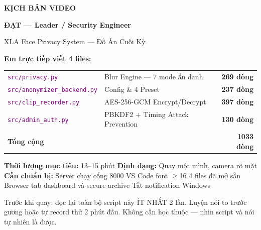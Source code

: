 \documentclass[12pt, a4paper]{article}
\newcommand{\fpath}[1]{\texttt{\textcolor{purple}{#1}}}
\begin{document}

\begin{titlepage}
\centering\vspace*{1.5cm}
{\Huge\bfseries\color{BrickRed} KỊCH BẢN VIDEO\par}
\vspace{0.3cm}
{\LARGE\bfseries\color{BrickRed!80} ĐẠT --- Leader / Security Engineer\par}
\vspace{0.5cm}
{\large\color{gray} XLA Face Privacy System --- Đồ Án Cuối Kỳ\par}
\vspace{1.2cm}

\begin{tcolorbox}[colback=BrickRed!7, colframe=BrickRed, width=0.9\textwidth]
\centering\large
\textbf{Em trực tiếp viết 4 files:}\\[0.4cm]
\renewcommand{\arraystretch}{1.5}
\begin{tabular}{llr}
  \hline
  \fpath{src/privacy.py} & Blur Engine — 7 mode ẩn danh & \textbf{269 dòng} \\
  \fpath{src/anonymizer\_backend.py} & Config \& 4 Preset & \textbf{237 dòng} \\
  \fpath{src/clip\_recorder.py} & AES-256-GCM Encrypt/Decrypt & \textbf{397 dòng} \\
  \fpath{src/admin\_auth.py} & PBKDF2 + Timing Attack Prevention & \textbf{130 dòng} \\
  \hline
  \multicolumn{2}{l}{\textbf{Tổng cộng}} & \textbf{1033 dòng} \\
  \hline
\end{tabular}
\end{tcolorbox}

\vspace{0.8cm}
\begin{tcolorbox}[colback=gray!6, colframe=gray!50, width=0.9\textwidth]
\textbf{Thời lượng mục tiêu:} 13--15 phút\quad
\textbf{Định dạng:} Quay một mình, camera rõ mặt\\[0.2cm]
\textbf{Cần chuẩn bị:}
Server chạy cổng 8000 \textbullet{}
VS Code font $\geq$16 \textbullet{}
4 files đã mở sẵn \textbullet{}
Browser tab dashboard và secure-archive \textbullet{}
Tắt notification Windows
\end{tcolorbox}

\vspace{0.8cm}
\begin{warn}
Trước khi quay: đọc lại toàn bộ script này ÍT NHẤT 2 lần.
Luyện nói to trước gương hoặc tự record thử 2 phút đầu.
Không cần học thuộc --- nhìn script và nói tự nhiên là được.
\end{warn}
\end{titlepage}
\end{document}
